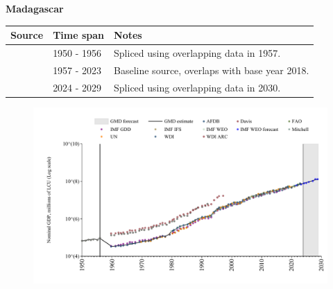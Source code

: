 \documentclass[12pt,a4paper,landscape]{article}
\begin{document}
\begin{adjustbox}{max totalsize={\paperwidth}{\paperheight},center}
\begin{minipage}[t][\textheight][t]{\textwidth}
\vspace*{0.5cm}
{}
\begin{center}
{\Large\bfseries Madagascar}
\end{center}
\vspace{0.5cm}
\begin{table}[H]
\centering
\small
\begin{tabular}{|l|l|l|}
\hline
\textbf{Source} & \textbf{Time span} & \textbf{Notes} \\
\hline
\rowcolor{white}\cite{Mitchell}& 1950 - 1956 &Spliced using overlapping data in 1957.\\
\rowcolor{lightgray}\cite{WDI}& 1957 - 2023 &Baseline source, overlaps with base year 2018.\\
\rowcolor{white}\cite{IMF_WEO_forecast}& 2024 - 2029 &Spliced using overlapping data in 2030.\\
\hline
\end{tabular}
\end{table}
\begin{figure}[H]
\centering
\includegraphics[width=\textwidth,height=0.6\textheight,keepaspectratio]{graphs/MDG_nGDP.pdf}
\end{figure}
\end{minipage}
\end{adjustbox}
\end{document}
